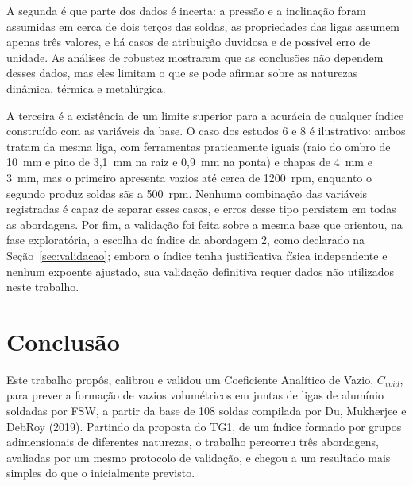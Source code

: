 \documentclass[12pt,openany]{report}
\begin{document}
A segunda é que parte dos dados é incerta: a pressão e a inclinação foram assumidas em cerca de dois terços das soldas, as propriedades das ligas assumem apenas três valores, e há casos de atribuição duvidosa e de possível erro de unidade. As análises de robustez mostraram que as conclusões não dependem desses dados, mas eles limitam o que se pode afirmar sobre as naturezas dinâmica, térmica e metalúrgica.

A terceira é a existência de um limite superior para a acurácia de qualquer índice construído com as variáveis da base. O caso dos estudos 6 e 8 é ilustrativo: ambos tratam da mesma liga, com ferramentas praticamente iguais (raio do ombro de 10~mm e pino de 3,1~mm na raiz e 0,9~mm na ponta) e chapas de 4~mm e 3~mm, mas o primeiro apresenta vazios até cerca de 1200~rpm, enquanto o segundo produz soldas sãs a 500~rpm. Nenhuma combinação das variáveis registradas é capaz de separar esses casos, e erros desse tipo persistem em todas as abordagens. Por fim, a validação foi feita sobre a mesma base que orientou, na fase exploratória, a escolha do índice da abordagem 2, como declarado na Seção~\ref{sec:validacao}; embora o índice tenha justificativa física independente e nenhum expoente ajustado, sua validação definitiva requer dados não utilizados neste trabalho.

\chapter{Conclusão}
\label{cap:conclusao}

Este trabalho propôs, calibrou e validou um Coeficiente Analítico de Vazio, $C_{void}$, para prever a formação de vazios volumétricos em juntas de ligas de alumínio soldadas por FSW, a partir da base de 108 soldas compilada por Du, Mukherjee e DebRoy (2019). Partindo da proposta do TG1, de um índice formado por grupos adimensionais de diferentes naturezas, o trabalho percorreu três abordagens, avaliadas por um mesmo protocolo de validação, e chegou a um resultado mais simples do que o inicialmente previsto.
\end{document}
